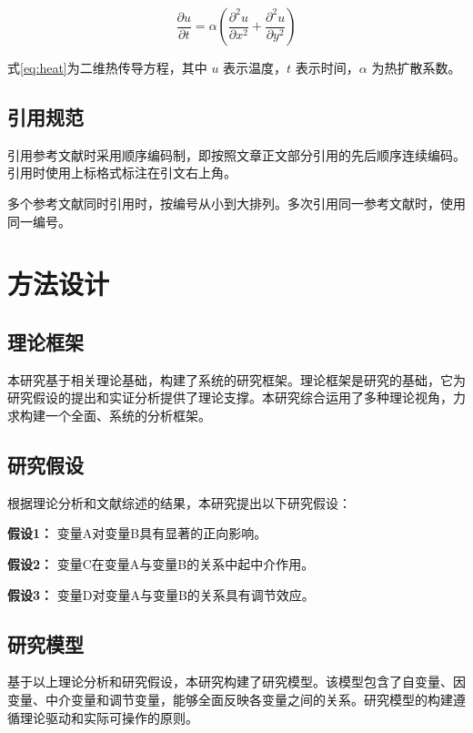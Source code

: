 \documentclass[numbering=arabic,fontset=auto]{jnuthesis}
\begin{document}
\begin{equation}
  \frac{\partial u}{\partial t} = \alpha \left(
    \frac{\partial^2 u}{\partial x^2} +
    \frac{\partial^2 u}{\partial y^2}
  \right)
  \label{eq:heat}
\end{equation}

式\eqref{eq:heat}为二维热传导方程，其中 $u$ 表示温度，$t$ 表示时间，$\alpha$ 为热扩散系数。

\section{引用规范}

引用参考文献时采用顺序编码制，即按照文章正文部分引用的先后顺序连续编码。引用时使用上标格式标注在引文右上角\supercite{ref-example-1}。

多个参考文献同时引用时，按编号从小到大排列。多次引用同一参考文献时，使用同一编号\supercite{ref-example-2}。

\chapter{方法设计}

\section{理论框架}

本研究基于相关理论基础，构建了系统的研究框架。理论框架是研究的基础，它为研究假设的提出和实证分析提供了理论支撑。本研究综合运用了多种理论视角，力求构建一个全面、系统的分析框架。

\section{研究假设}

根据理论分析和文献综述的结果，本研究提出以下研究假设：

\textbf{假设1：} 变量A对变量B具有显著的正向影响。

\textbf{假设2：} 变量C在变量A与变量B的关系中起中介作用。

\textbf{假设3：} 变量D对变量A与变量B的关系具有调节效应。

\section{研究模型}

基于以上理论分析和研究假设，本研究构建了研究模型。该模型包含了自变量、因变量、中介变量和调节变量，能够全面反映各变量之间的关系。研究模型的构建遵循理论驱动和实际可操作的原则。
\end{document}
